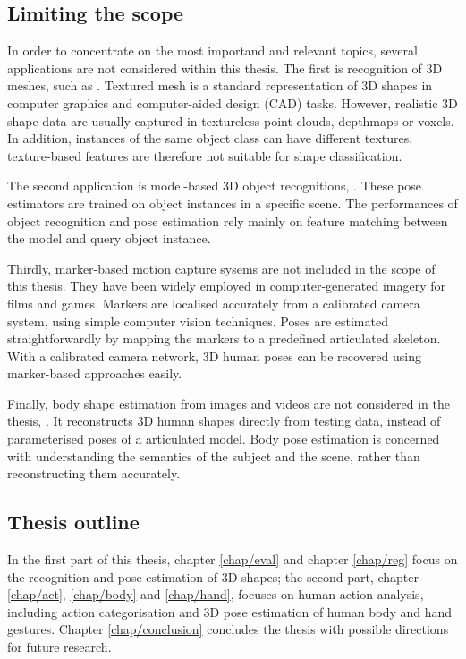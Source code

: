 \subsection{Limiting the scope}

In order to concentrate on the most importand and relevant topics, 
several applications are not considered within this thesis. 
The first is recognition of 3D meshes, such as \cite{Zaharescu2009, Bronstein2011, Kokkinos2012}. Textured mesh is a standard representation of 3D shapes in computer graphics and computer-aided design (CAD) tasks. However, realistic 3D shape data are usually captured in textureless point clouds, depthmaps or voxels. In addition, instances of the same object class can have different textures, texture-based features are therefore not suitable for shape classification.      

The second application is model-based 3D object recognitions, \eg \cite{Mian2006, Rothganger2006, Shang2010}. These pose estimators are trained on object instances in a specific scene. The performances of object recognition and pose estimation rely mainly on feature matching between the model and query object instance. 

Thirdly, marker-based motion capture sysems are not included in the scope of this thesis. They have been widely employed in computer-generated imagery for films and games. Markers are localised accurately from a calibrated camera system, using simple computer vision techniques. Poses are estimated straightforwardly by mapping the markers to a predefined articulated skeleton.
 With a calibrated camera network, 3D human poses can be recovered using marker-based approaches easily.  

Finally, body shape estimation from images and videos are not considered in the thesis, \cite{Guan2009, Rother2009, Chen2011}. It reconstructs 3D human shapes directly from testing data, instead of parameterised poses of a articulated model. Body pose estimation is concerned with understanding the semantics of the subject and the scene, rather than reconstructing them accurately. 

\subsection{Thesis outline}

In the first part of this thesis, chapter \ref{chap/eval} and chapter \ref{chap/reg} focus on the recognition and pose estimation of 3D shapes; the second part, chapter \ref{chap/act}, \ref{chap/body} and \ref{chap/hand}, focuses on human action analysis, including action categorisation and 3D pose estimation of human body and hand gestures. Chapter \ref{chap/conclusion} concludes the thesis with possible directions for future research. 

